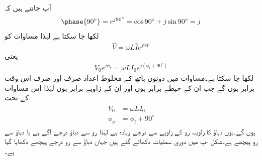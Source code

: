 آپ جانتے ہیں کہ
\begin{align}\label{مساوات_بدلتا_عمود}
\phase{90^{\circ}}=e^{j90^{\circ}}=\cos 90^{\circ}+j \sin 90^{\circ}=j
\end{align}
لکھا جا سکتا ہے لہٰذا مساوات  کو 
\begin{align*}
\hat{V}=\omega L \hat{I} e^{j90^{\circ}}
\end{align*} 
یعنی
\begin{align}\label{مساوات_بدلتا_امالہ_تعددی_تعلق_ب}
V_0 e^{j\phi_v}=\omega L I_0 e^{j (\phi_i+90^{\circ})}
\end{align} 
لکھا جا سکتا ہے۔مساوات  میں دونوں ہاتھ کے مخلوط اعداد صرف اور صرف اس وقت برابر ہوں گے جب ان کے حیطے برابر ہوں اور ان کے زاویے برابر ہوں لہٰذا اس مساوات کے تحت
\begin{gather}
\begin{aligned}\label{مساوات_بدلتا_امالہ_رو_پیچھے_ہے}
V_0&=\omega L I_0\\
\phi_v&=\phi_i+90^{\circ}
\end{aligned}
\end{gather}
ہوں گے۔یوں دباؤ کا زاویہ، رو کے زاویے سے  درجے زیادہ ہے لہٰذا رو سے دباؤ  درجے آگے ہے یا دباؤ سے رو  پیچھے ہے۔شکل -پ میں دوری سمتیات دکھائے گئے ہیں جہاں دباؤ سے رو  درجے پیچھے دکھایا گیا ہے۔

